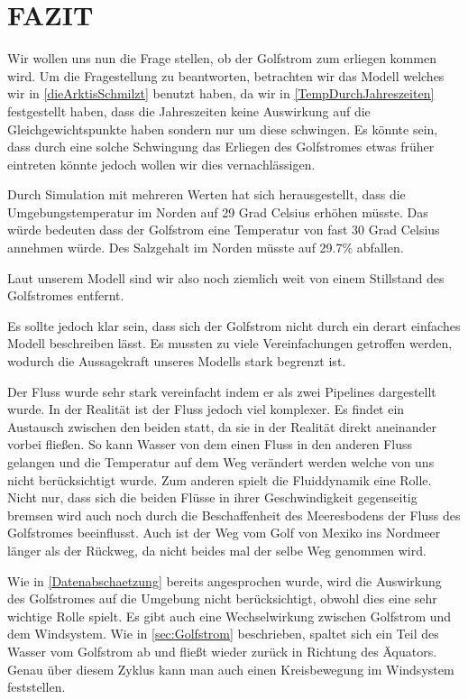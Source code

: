 \documentclass[a4paper,twoside]{article}
\begin{document}
	\section{\uppercase{Fazit}}\label{sec:Fazit}
	
	Wir wollen uns nun die Frage stellen, ob  der Golfstrom zum erliegen kommen wird. Um die Fragestellung zu beantworten, betrachten wir das Modell welches wir in \ref{dieArktisSchmilzt} benutzt haben, da wir in \ref{TempDurchJahreszeiten} festgestellt haben, dass die Jahreszeiten keine Auswirkung auf die Gleichgewichtspunkte haben sondern nur um diese schwingen. Es könnte sein, dass durch eine solche Schwingung das Erliegen des Golfstromes etwas früher eintreten könnte jedoch wollen wir dies vernachlässigen.
	
	Durch Simulation mit mehreren Werten hat sich herausgestellt, dass die Umgebungstemperatur im Norden auf 29 Grad Celsius erhöhen müsste. Das würde bedeuten dass der Golfstrom eine Temperatur von fast 30 Grad Celsius annehmen würde. Des Salzgehalt im Norden müsste auf 29.7\% abfallen. 
	
	Laut unserem Modell sind wir also noch ziemlich weit von einem Stillstand des Golfstromes entfernt. 
	
	Es sollte jedoch klar sein, dass sich der Golfstrom nicht durch ein derart einfaches Modell beschreiben lässt. Es mussten zu viele Vereinfachungen getroffen werden, wodurch die Aussagekraft unseres Modells stark begrenzt ist. 
	
	Der Fluss wurde sehr stark vereinfacht indem er als zwei Pipelines dargestellt wurde. In der Realität ist der Fluss jedoch viel komplexer. Es findet ein Austausch zwischen den beiden statt, da sie in der Realität direkt aneinander vorbei fließen. So kann Wasser von dem einen Fluss in den anderen Fluss gelangen und die Temperatur auf dem Weg verändert werden welche von uns nicht berücksichtigt wurde. Zum anderen spielt die Fluiddynamik eine Rolle. Nicht nur, dass sich die beiden Flüsse in ihrer Geschwindigkeit gegenseitig bremsen wird auch noch durch die Beschaffenheit des Meeresbodens der Fluss des Golfstromes beeinflusst. Auch ist der Weg vom Golf von Mexiko ins Nordmeer länger als der Rückweg, da nicht beides mal der selbe Weg genommen wird.
	
	Wie in \ref{Datenabschaetzung} bereits angesprochen wurde, wird die Auswirkung des Golfstromes auf die Umgebung nicht berücksichtigt, obwohl dies eine sehr wichtige Rolle spielt. Es gibt auch eine Wechselwirkung zwischen Golfstrom und dem Windsystem. Wie in \ref{sec:Golfstrom} beschrieben, spaltet sich ein Teil des Wasser vom Golfstrom ab und fließt wieder zurück in Richtung des Äquators. Genau über diesem Zyklus kann man auch einen Kreisbewegung im Windsystem feststellen.
	
\end{document}
